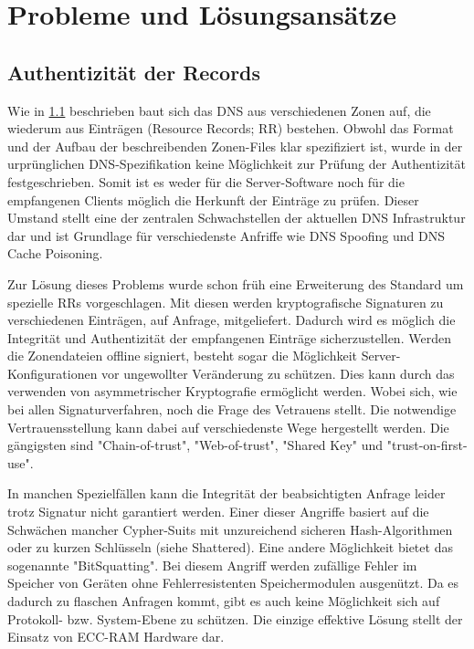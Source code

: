 \chapter{Probleme und Lösungsansätze}

\section{Authentizität der Records}
Wie in \ref{} beschrieben baut sich das DNS aus verschiedenen Zonen auf, die wiederum aus Einträgen (Resource Records; RR) bestehen. Obwohl das Format und der Aufbau der beschreibenden Zonen-Files klar spezifiziert ist, wurde in der urprünglichen DNS-Spezifikation keine Möglichkeit zur Prüfung der Authentizität festgeschrieben. Somit ist es weder für die Server-Software noch für die empfangenen Clients möglich die Herkunft der Einträge zu prüfen. Dieser Umstand stellt eine der zentralen Schwachstellen der aktuellen DNS Infrastruktur dar und ist Grundlage für verschiedenste Anfriffe wie DNS Spoofing und DNS Cache Poisoning.

Zur Lösung dieses Problems wurde schon früh eine Erweiterung des Standard um spezielle RRs vorgeschlagen. Mit diesen werden kryptografische Signaturen zu verschiedenen Einträgen, auf Anfrage, mitgeliefert. Dadurch wird es möglich die Integrität und Authentizität der empfangenen Einträge sicherzustellen. Werden die Zonendateien offline signiert, besteht sogar die Möglichkeit Server-Konfigurationen vor ungewollter Veränderung zu schützen. Dies kann durch das verwenden von asymmetrischer Kryptografie ermöglicht werden. Wobei sich, wie bei allen Signaturverfahren, noch die Frage des Vetrauens stellt. Die notwendige Vertrauensstellung kann dabei auf verschiedenste Wege hergestellt werden. Die gängigsten sind "Chain-of-trust", "Web-of-trust", "Shared Key" und "trust-on-first-use".

In manchen Spezielfällen kann die Integrität der beabsichtigten Anfrage leider trotz Signatur nicht garantiert werden. Einer dieser Angriffe basiert auf die Schwächen mancher Cypher-Suits mit unzureichend sicheren Hash-Algorithmen oder zu kurzen Schlüsseln (siehe Shattered). Eine andere Möglichkeit bietet das sogenannte "BitSquatting". Bei diesem Angriff werden zufällige Fehler im Speicher von Geräten ohne Fehlerresistenten Speichermodulen ausgenützt. Da es dadurch zu flaschen Anfragen kommt, gibt es auch keine Möglichkeit sich auf Protokoll- bzw. System-Ebene zu schützen. Die einzige effektive Lösung stellt der Einsatz von ECC-RAM Hardware dar.   

